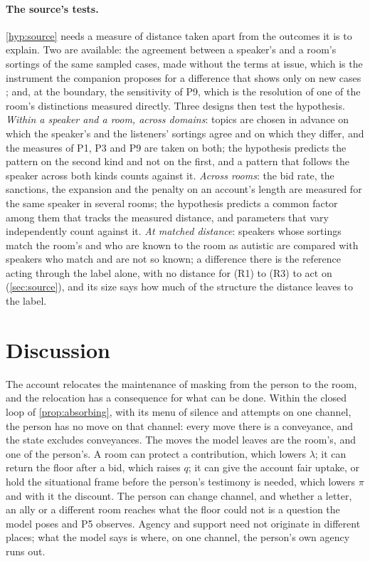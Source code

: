 \paragraph{The source's tests.} \autoref{hyp:source} needs a measure of distance taken apart from the outcomes it is to explain. Two are available: the agreement between a speaker's and a room's sortings of the same sampled cases, made without the terms at issue, which is the instrument the companion proposes for a difference that shows only on new cases \cite{NormCost}; and, at the boundary, the sensitivity of P9, which is the resolution of one of the room's distinctions measured directly. Three designs then test the hypothesis. \emph{Within a speaker and a room, across domains}: topics are chosen in advance on which the speaker's and the listeners' sortings agree and on which they differ, and the measures of P1, P3 and P9 are taken on both; the hypothesis predicts the pattern on the second kind and not on the first, and a pattern that follows the speaker across both kinds counts against it. \emph{Across rooms}: the bid rate, the sanctions, the expansion and the penalty on an account's length are measured for the same speaker in several rooms; the hypothesis predicts a common factor among them that tracks the measured distance, and parameters that vary independently count against it. \emph{At matched distance}: speakers whose sortings match the room's and who are known to the room as autistic are compared with speakers who match and are not so known; a difference there is the reference acting through the label alone, with no distance for (R1) to (R3) to act on (\autoref{sec:source}), and its size says how much of the structure the distance leaves to the label.

\section{Discussion}\label{sec:discussion}

The account relocates the maintenance of masking from the person to the room, and the relocation has a consequence for what can be done. Within the closed loop of \autoref{prop:absorbing}, with its menu of silence and attempts on one channel, the person has no move on that channel: every move there is a conveyance, and the state excludes conveyances. The moves the model leaves are the room's, and one of the person's. A room can protect a contribution, which lowers $\lambda$; it can return the floor after a bid, which raises $q$; it can give the account fair uptake, or hold the situational frame before the person's testimony is needed, which lowers $\pi$ and with it the discount. The person can change channel, and whether a letter, an ally or a different room reaches what the floor could not is a question the model poses and P5 observes. Agency and support need not originate in different places; what the model says is where, on one channel, the person's own agency runs out.

